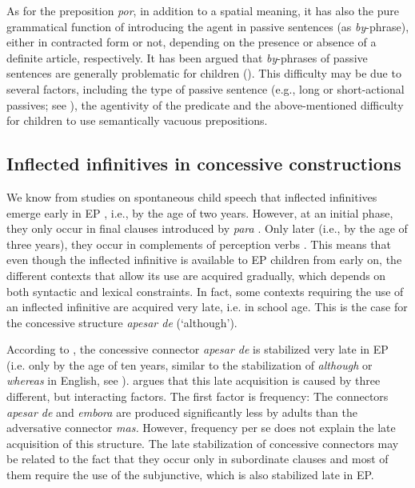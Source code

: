 \documentclass[output=paper]{langscibook}
\begin{document}
As for the preposition \textit{por}, in addition to a spatial meaning, it has also the pure grammatical function of introducing the agent in passive sentences (as \textit{by}-phrase), either in contracted form or not, depending on the presence or absence of a definite article, respectively. It has been argued that \textit{by}{}-phrases of passive sentences are generally problematic for children (\citealt{FoxGrodzinsky1998}). This difficulty may be due to several factors, including the type of passive sentence (e.g., long or short-actional passives; see \citealt{ArmonLotemLely2016}), the agentivity of the predicate \citep{Estrela2015} and the above-mentioned difficulty for children to use semantically vacuous prepositions. 

\subsection{Inflected infinitives in concessive constructions}\label{sec:rinke:3.4}

We know from studies on spontaneous child speech that inflected infinitives emerge early in EP \citep{Santos2017}, i.e., by the age of two years. However, at an initial phase, they only occur in final clauses introduced by \textit{para} \citep{Santos2013}. Only later (i.e., by the age of three years), they occur in complements of perception verbs \citep{SantosHyams2016}. This means that even though the inflected infinitive is available to EP children from early on, the different contexts that allow its use are acquired gradually, which depends on both syntactic and lexical constraints. In fact, some contexts requiring the use of an inflected infinitive are acquired very late, i.e. in school age. This is the case for the concessive structure \textit{apesar de} (`although'). 

According to \citet{Costa2006}, the concessive connector \textit{apesar de} is stabilized very late in EP (i.e. only by the age of ten years, similar to the stabilization of \textit{although} or \textit{whereas} in English, see \citealt{Diessel2004}). \citet{Costa2006} argues that this late acquisition is caused by three different, but interacting factors. The first factor is frequency: The connectors \textit{apesar de} and \textit{embora} are produced significantly less by adults than the adversative connector \textit{mas.} However, frequency per se does not explain the late acquisition of this structure. The late stabilization of concessive connectors may be related to the fact that they occur only in subordinate clauses and most of them require the use of the subjunctive, which is also stabilized late in EP. 
\end{document}
